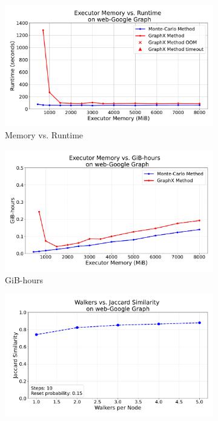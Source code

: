 \begin{figure}[H]
    \centering
    \begin{subfigure}[t]{0.5\linewidth}
        \centering
        \includegraphics[width=\linewidth]{images/plots/web-Google/memory_vs_runtime_web_google.pdf}
        \caption{Memory vs. Runtime}
        \label{fig:wikirun}
    \end{subfigure}\hfill
    \begin{subfigure}[t]{0.5\linewidth}
        \centering
        \includegraphics[width=\linewidth]{images/plots/web-Google/gbhrs_nodes_web_google.pdf}
        \caption{GiB-hours}
        \label{fig:wikigibhrs}
    \end{subfigure}
    \begin{subfigure}[t]{0.5\linewidth}
        \centering
        \includegraphics[width=\linewidth]{images/plots/web-Google/accuracy_plots_web_google.pdf}

\end{subfigure}
\end{figure}
